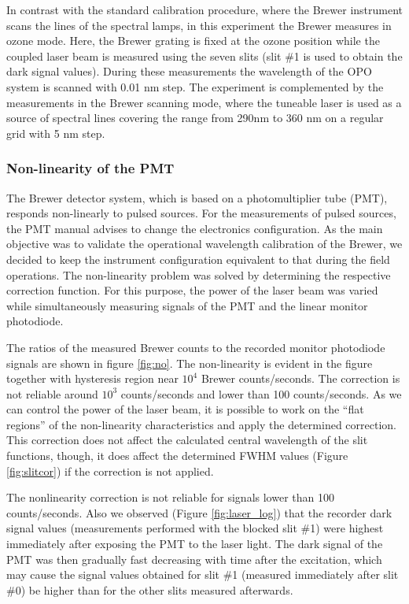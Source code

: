 \documentclass[acp]{copernicus} %
\begin{document}


In contrast with the standard calibration procedure, where the Brewer instrument scans the lines of the spectral lamps, in this experiment the Brewer measures in ozone mode. Here, the Brewer grating is fixed at the ozone position while the coupled laser beam is measured using the seven slits (slit  \#1 is used to obtain the dark signal values). During these measurements the wavelength of the OPO system is scanned with 0.01 \unit{nm} step. The experiment is complemented by the measurements in the Brewer scanning mode, where the tuneable laser is used as a source of spectral lines covering the range from 290\unit{nm} to 360 \unit{nm} on a regular grid with 5 \unit{nm} step.



\subsubsection{Non-linearity of the PMT }

The Brewer detector system, which is based on a photomultiplier tube (PMT), responds non-linearly to pulsed sources. For the measurements of pulsed sources, the PMT manual advises to change the electronics configuration. As the main objective was to validate the operational wavelength calibration of the Brewer, we decided to keep the instrument configuration equivalent to that during the field operations. The non-linearity problem was solved by determining the respective correction function. For this purpose, the power of the laser beam was varied while simultaneously measuring signals of the PMT and the linear monitor photodiode.


The ratios of the measured Brewer counts to the recorded monitor photodiode signals are shown in figure  \ref{fig:no}. The non-linearity is evident in the figure together with hysteresis region near $10^4$  Brewer counts/seconds. The correction is not reliable  around $10^3$ counts/seconds and lower than 100 counts/seconds. As we can control the power of the laser beam, it is possible to work on the “flat regions” of the non-linearity characteristics and apply the determined correction. This correction does not affect the calculated central wavelength of the slit functions, though, it does affect the determined FWHM values (Figure \ref{fig:slitcor}) if the correction is not applied.

The nonlinearity correction is not reliable for signals lower than 100 counts/seconds. Also we observed (Figure \ref{fig:laser_log}) that the recorder dark signal values (measurements performed with the blocked slit \#1) were highest immediately after exposing the PMT to the laser light. The dark signal of the PMT was then gradually fast decreasing with time after the excitation, which may cause the signal values obtained for slit \#1 (measured immediately after slit \#0) be higher than for the other slits measured afterwards.
\end{document}

